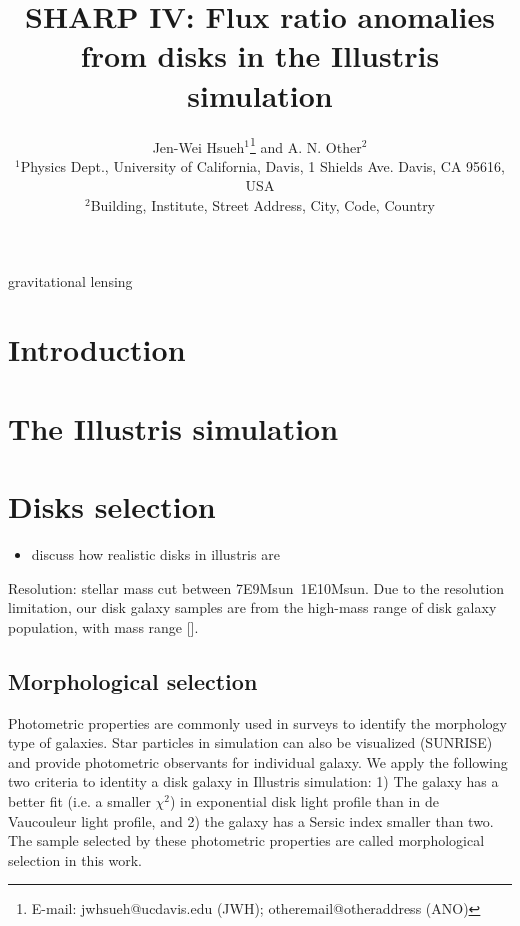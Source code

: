 \documentclass[useAMS,usenatbib]{mn2e}
\title[Flux ratio anomalies from disks]{
SHARP IV: Flux ratio anomalies from disks in the Illustris simulation
}
\author[Hsueh et al.]{Jen-Wei Hsueh$^{1}$\thanks{E-mail:
jwhsueh@ucdavis.edu (JWH); otheremail@otheraddress (ANO)} and A. N.
Other$^{2}$\\
$^{1}$Physics Dept., University of California, Davis, 1 Shields Ave.
Davis, CA 95616, USA\\
$^{2}$Building, Institute, Street Address, City, Code, Country}
\begin{document}

\pagerange{\pageref{firstpage}--\pageref{lastpage}} 

\maketitle

\label{firstpage}

\begin{abstract}

\end{abstract}

\begin{keywords}
gravitational lensing
\end{keywords}

\section{Introduction}
\section{The Illustris simulation}
\section{Disks selection}
\begin{itemize}
\item discuss how realistic disks in illustris are
\end{itemize}
Resolution: stellar mass cut between 7E9Msun~1E10Msun. Due to the resolution limitation, our disk galaxy samples are from the high-mass range of disk galaxy population, with mass range [].  

\subsection{Morphological selection}
Photometric properties are commonly used in surveys to identify the morphology type of galaxies. Star particles in simulation can also be visualized (SUNRISE) and provide photometric observants for individual galaxy. We apply the following two criteria to identity a disk galaxy in Illustris simulation: 1) The galaxy has a 
better fit (i.e. a smaller $\chi^2$) in exponential disk light profile than in de Vaucouleur light profile, and 2) the galaxy has a Sersic index smaller than two. The sample selected by these photometric properties are called morphological selection in this work.
\end{document}
